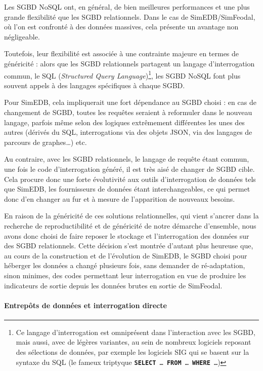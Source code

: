 			Les SGBD NoSQL ont, en général, de bien meilleures performances et une plus grande flexibilité que les SGBD relationnels.
			Dans le cas de SimEDB/SimFeodal, où l'on est confronté à des données massives, cela présente un avantage non négligeable.

			Toutefois, leur flexibilité est associée à une contrainte majeure en termes de généricité : alors que les SGBD relationnels partagent un langage d'interrogation commun, le SQL (\textit{Structured Query Language})\footnote{
			Ce langage d'interrogation est omniprésent dans l'interaction avec les SGBD, mais aussi, avec de légères variantes, au sein de nombreux logiciels reposant des sélections de données, par exemple les logiciels SIG qui se basent sur la syntaxe du SQL (le fameux triptyque \texttt{\textbf{SELECT} \ldots~\textbf{FROM} \ldots{} \textbf{WHERE} \ldots})
			}, les SGBD NoSQL font plus souvent appels à des langages spécifiques à chaque SGBD.

			Pour SimEDB, cela impliquerait une fort dépendance au SGBD choisi : en cas de changement de SGBD, toutes les requêtes seraient à reformuler dans le nouveau langage, parfois même selon des logiques extrêmement différentes les unes des autres (dérivés du SQL, interrogations via des objets JSON, via des langages de parcours de graphes\ldots{}) etc.

			Au contraire, avec les SGBD relationnels, le langage de requête étant commun, une fois le code d'interrogation généré, il est très aisé de changer de SGBD cible.
			Cela procure donc une forte évolutivité aux outils d'interrogation de données tels que SimEDB, les fournisseurs de données étant interchangeables, ce qui permet donc d'en changer au fur et à mesure de l'apparition de nouveaux besoins.

			En raison de la généricité de ces solutions relationnelles, qui vient s'ancrer dans la recherche de reproductibilité et de généricité de notre démarche d'ensemble, nous avons donc choisi de faire reposer le stockage et l'interrogation des données sur des SGBD relationnels. Cette décision s'est montrée d'autant plus heureuse que, au cours de la construction et de l'évolution de SimEDB, le SGBD choisi pour héberger les données a changé plusieurs fois, sans demander de ré-adaptation, sinon minimes, des codes permettant leur interrogation en vue de produire les indicateurs de sortie depuis les données brutes en sortie de SimFeodal.


			\paragraph*{Entrepôts de données et interrogation directe}\label{par:interrogation-directe}

